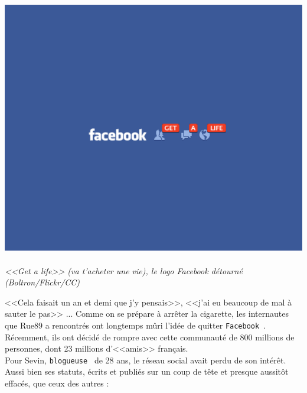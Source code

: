 \documentclass[11pt,twoside,a4paper]{article}
\begin{document}
\begin{minipage}[h]{0.42\textwidth}
	\begin{center}
		\includegraphics[width=1.00\textwidth]{img/1211-facebook-get-a-life_0.png}~\\
		\emph{<<Get a life>> (va t'acheter une vie), le logo Facebook d{\'e}tourn{\'e} (Boltron/Flickr/CC)~\footnotemark}
		
	\end{center}
\end{minipage} \hfill \begin{minipage}[h]{0.55\textwidth}
	<<Cela faisait un an et demi que j'y pensais>>, <<j'ai eu beaucoup de mal {\`a} sauter le pas>> ... Comme on se pr{\'e}pare {\`a} arr{\^e}ter la cigarette, les internautes que Rue89 a rencontr{\'e}s ont longtemps m{\^u}ri l'id{\'e}e de quitter \texttt{Facebook~\footnotemark}. ~\\

	R{\'e}cemment, ils ont d{\'e}cid{\'e} de rompre avec cette communaut{\'e} de 800 millions de personnes, dont 23 millions d'<<amis>> fran\c{c}ais. ~\\

	Pour Sevin, \texttt{blogueuse~\footnotemark} de 28 ans, le r{\'e}seau social avait perdu de son int{\'e}r{\^e}t. Aussi bien ses statuts, {\'e}crits et publi{\'e}s sur un coup de t{\^e}te et presque aussit{\^o}t effac{\'e}s, que ceux des autres : ~\\
	

\end{minipage}
\end{document}
